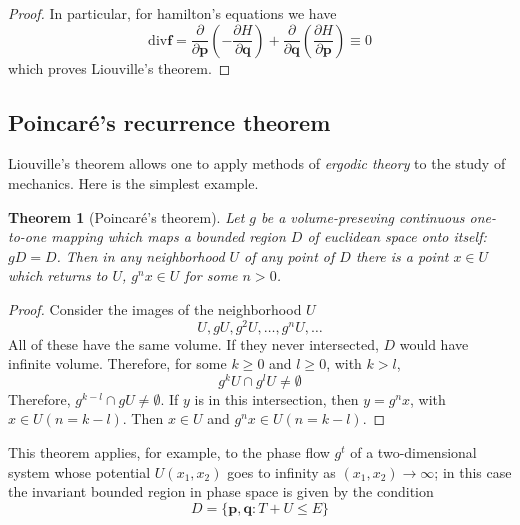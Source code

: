 \documentclass[conference]{IEEEtran}
\newtheorem{theorem}{Theorem}[section]
\theoremstyle{definition}
\theoremstyle{remark}
\begin{document}
    \begin{proof}
        In particular, for hamilton's equations we have
        \begin{equation*}
            \mathrm{div} \mathbf{f} = \dfrac{\partial}{\partial \mathbf{p}} \left( -\dfrac{\partial H}{\partial \mathbf{q}} \right) + \dfrac{\partial}{\partial \mathbf{q}} \left( \dfrac{\partial H}{\partial \mathbf{p}} \right) \equiv 0
        \end{equation*}
        which proves Liouville's theorem.
    \end{proof}

    \subsection{Poincar\'{e}'s recurrence theorem}
    Liouville's theorem allows one to apply methods of \emph{ergodic theory} to the study of mechanics. Here is the simplest example.

    \begin{theorem}[Poincar\'{e}'s theorem]
        Let $g$ be a volume-preseving continuous one-to-one mapping which maps a bounded region $D$ of euclidean space onto itself: $gD=D$. Then in any neighborhood $U$ of any point of $D$ there is a point $x \in U$ which returns to $U$, $g^n x \in U$ for some $n > 0$.
    \end{theorem}

    \begin{proof}
        Consider the images of the neighborhood $U$
        \begin{equation*}
            U, gU, g^2U, \dots, g^nU, \dots
        \end{equation*}
        All of these have the same volume. If they never intersected, $D$ would have infinite volume. Therefore, for some $k \geq 0$ and $l \geq 0$, with $k > l$,
        \begin{equation*}
            g^k U \cap g^lU \neq \emptyset
        \end{equation*}
        Therefore, $g^{k-l} \cap g U \neq \emptyset$. If $y$ is in this intersection, then $y = g^n x$, with $x \in U (n = k - l)$. Then $x \in U$ and $g^n x \in U(n = k - l)$.
    \end{proof}

    This theorem applies, for example, to the phase flow $g^t$ of a two-dimensional system whose potential $U(x_1, x_2)$ goes to infinity as $(x_1, x_2) \to \infty$; in this case the invariant bounded region in phase space is given by the condition
    \begin{equation*}
        D = \{ \mathbf{p}, \mathbf{q}: T + U \leq E \}
    \end{equation*}
\end{document}
